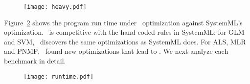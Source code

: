 \begin{figure}
    \centering  \texttt{[image: heavy.pdf]}
    \caption{}
    \label{heavy}
    \vspace*{5pt}
\end{figure}
Figure~\ref{eval} shows the program run time under \sys\ optimization against SystemML's
optimization. 
 \sys\ is competitive with the hand-coded rules
in SystemML: for GLM and SVM, \sys\ discovers the same
optimizations as SystemML does. For ALS, MLR and PNMF,
\sys\ found new optimizations that lead to .
We next analyze each benchmark in detail. 
\begin{figure}
    \centering  \texttt{[image: runtime.pdf]}
    \caption{} 
    \label{eval}
    \vspace{5pt}
\end{figure}






